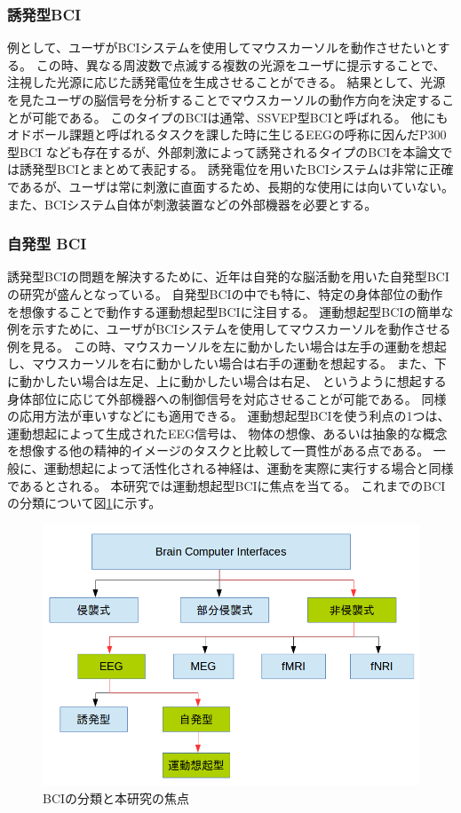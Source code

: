 \subsubsection{{\mc 誘発型}\rm BCI}
例として、ユーザがBCIシステムを使用してマウスカーソルを動作させたいとする。 
この時、異なる周波数で点滅する複数の光源をユーザに提示することで、
注視した光源に応じた誘発電位を生成させることができる。
結果として、光源を見たユーザの脳信号を分析することでマウスカーソルの動作方向を決定することが可能である。
このタイプのBCIは通常、SSVEP型BCIと呼ばれる。
他にもオドボール課題と呼ばれるタスクを課した時に生じるEEGの呼称に因んだP300型BCI
なども存在するが、外部刺激によって誘発されるタイプのBCIを本論文では誘発型BCIとまとめて表記する。
誘発電位を用いたBCIシステムは非常に正確であるが、ユーザは常に刺激に直面するため、長期的な使用には向いていない。
また、BCIシステム自体が刺激装置などの外部機器を必要とする。
\subsubsection{\mc 自発型 \rm BCI}
誘発型BCIの問題を解決するために、近年は自発的な脳活動を用いた自発型BCIの研究が盛んとなっている。
自発型BCIの中でも特に、特定の身体部位の動作を想像することで動作する運動想起型BCIに注目する。
運動想起型BCIの簡単な例を示すために、ユーザがBCIシステムを使用してマウスカーソルを動作させる例を見る。
この時、マウスカーソルを左に動かしたい場合は左手の運動を想起し、マウスカーソルを右に動かしたい場合は右手の運動を想起する。
また、下に動かしたい場合は左足、上に動かしたい場合は右足、
というように想起する身体部位に応じて外部機器への制御信号を対応させることが可能である。
同様の応用方法が車いすなどにも適用できる。
運動想起型BCIを使う利点の1つは、運動想起によって生成されたEEG信号は、
物体の想像、あるいは抽象的な概念を想像する他の精神的イメージのタスクと比較して一貫性がある点である。
一般に、運動想起によって活性化される神経は、運動を実際に実行する場合と同様であるとされる\cite{運動想起}。
本研究では運動想起型BCIに焦点を当てる。
これまでのBCIの分類について図\ref{fig:BCIclass}に示す。

\begin{figure}[tb]
    \centering
    \includegraphics[width=14cm]{images/BCIclass.png}
    \caption{BCIの分類と本研究の焦点}
    \label{fig:BCIclass}
\end{figure}

